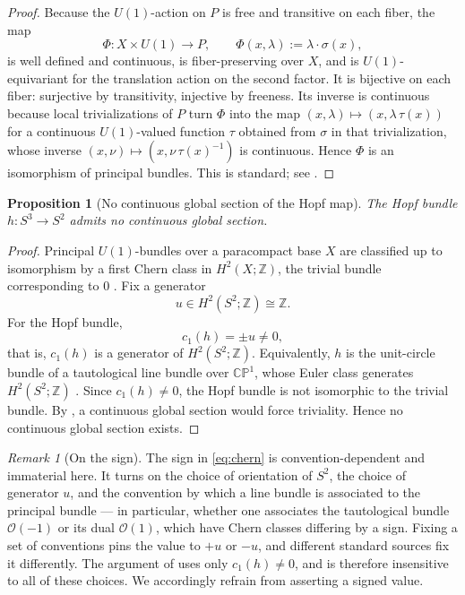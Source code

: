 \documentclass[11pt,reqno]{amsart}
\theoremstyle{plain}
\newtheorem{proposition}[theorem]{Proposition}
\theoremstyle{definition}
\theoremstyle{remark}
\newtheorem{remark}[theorem]{Remark}
\newcommand{\Z}{\mathbb{Z}}
\begin{document}
\begin{proof}
Because the $U(1)$-action on $P$ is free and transitive on each fiber, the map
\[
\Phi\colon X\times U(1)\longrightarrow P,
\qquad
\Phi(x,\lambda):=\lambda\cdot\sigma(x),
\]
is well defined and continuous, is fiber-preserving over $X$, and is $U(1)$-equivariant for the translation action on the second factor. It is bijective on each fiber: surjective by transitivity, injective by freeness. Its inverse is continuous because local trivializations of $P$ turn $\Phi$ into the map $(x,\lambda)\mapsto(x,\lambda\,\tau(x))$ for a continuous $U(1)$-valued function $\tau$ obtained from $\sigma$ in that trivialization, whose inverse $(x,\nu)\mapsto(x,\nu\,\tau(x)^{-1})$ is continuous. Hence $\Phi$ is an isomorphism of principal bundles. This is standard; see \cite{Steenrod,Husemoller,KobayashiNomizu}.
\end{proof}

\begin{proposition}[No continuous global section of the Hopf map]
\label{prop:hopftop}
The Hopf bundle $h\colon S^{3}\to S^{2}$ admits no continuous global section.
\end{proposition}

\begin{proof}
Principal $U(1)$-bundles over a paracompact base $X$ are classified up to isomorphism by a first Chern class in $H^{2}(X;\Z)$, the trivial bundle corresponding to $0$ \cite{Husemoller,MilnorStasheff,Hatcher}. Fix a generator
\[
u\in H^{2}(S^{2};\Z)\cong\Z .
\]
For the Hopf bundle,
\begin{equation}
\label{eq:chern}
c_{1}(h)=\pm u\neq 0 ,
\end{equation}
that is, $c_{1}(h)$ is a generator of $H^{2}(S^{2};\Z)$. Equivalently, $h$ is the unit-circle bundle of a tautological line bundle over $\mathbb{CP}^{1}$, whose Euler class generates $H^{2}(S^{2};\Z)$ \cite{MilnorStasheff,BottTu}. Since $c_{1}(h)\neq 0$, the Hopf bundle is not isomorphic to the trivial bundle. By , a continuous global section would force triviality. Hence no continuous global section exists.
\end{proof}

\begin{remark}[On the sign]
The sign in \eqref{eq:chern} is convention-dependent and immaterial here. It turns on the choice of orientation of $S^{2}$, the choice of generator $u$, and the convention by which a line bundle is associated to the principal bundle --- in particular, whether one associates the tautological bundle $\mathcal{O}(-1)$ or its dual $\mathcal{O}(1)$, which have Chern classes differing by a sign. Fixing a set of conventions pins the value to $+u$ or $-u$, and different standard sources fix it differently. The argument of  uses only $c_{1}(h)\neq 0$, and is therefore insensitive to all of these choices. We accordingly refrain from asserting a signed value.
\end{remark}
\end{document}
